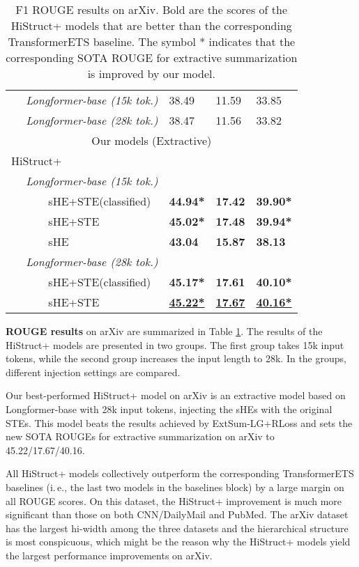 \documentclass[11pt]{article}
\begin{document}
\begin{table}[ht]
\begin{tabular}[t]{@{}llll@{}}
~~ \textit{Longformer-base (15k tok.)}   & 38.49    & 11.59   & 33.85   \\
~~ \textit{Longformer-base (28k tok.)}   & 38.47    & 11.56   & 33.82   \\ \midrule
\multicolumn{4}{c}{Our models (Extractive)}      \\ \midrule
HiStruct+  &&&\\
~~ \textit{Longformer-base (15k tok.)}  &&&  \\ 
~~~~~~ sHE+STE(classified)         & \textbf{44.94*}   & \textbf{17.42}   & \textbf{39.90*}   \\
~~~~~~ sHE+STE                     & \textbf{45.02*}   & \textbf{17.48}   & \textbf{39.94*}  \\
~~~~~~ sHE                         & \textbf{43.04}    & \textbf{15.87}   & \textbf{38.13}   \\ 
~~ \textit{Longformer-base (28k tok.)}  &&&  \\ 
~~~~~~ sHE+STE(classified)         & \textbf{45.17*}   & \textbf{17.61}   & \textbf{40.10*}   \\
~~~~~~ sHE+STE                     & \underline{\textbf{45.22*}}   & \underline{\textbf{17.67}}   & \underline{\textbf{40.16*}}  \\ \bottomrule
\end{tabular}
\caption[Results on arXiv]{F1 ROUGE results on arXiv. Bold are the scores of the HiStruct+ models that are better than the corresponding TransformerETS baseline. The symbol * indicates that the corresponding SOTA ROUGE for extractive summarization is improved by our model. }
\label{tab:arxiv_result}
\end{table}


\textbf{ROUGE results} on arXiv are summarized in Table \ref{tab:arxiv_result}. 
The results of the HiStruct+ models are presented in two groups. The first group takes 15k input tokens, while the second group increases the input length to 28k. In the groups, different injection settings are compared. 

Our best-performed HiStruct+ model on arXiv is an extractive model based on Longformer-base with 28k input tokens, injecting the sHEs with the original STEs. This model beats the results achieved by ExtSum-LG+RLoss and sets the new SOTA ROUGEs for extractive summarization on arXiv to 45.22/17.67/40.16. 

All HiStruct+ models collectively outperform the corresponding TransformerETS baselines (i.\,e., the last two models in the baselines block) by a large margin on all ROUGE scores. On this dataset, the HiStruct+ improvement is much more significant than those on both CNN/DailyMail and PubMed. The arXiv dataset has the largest hi-width among the three datasets and the hierarchical structure is most conspicuous, which might be the reason why the HiStruct+ models yield the largest performance improvements on arXiv.
\end{document}
